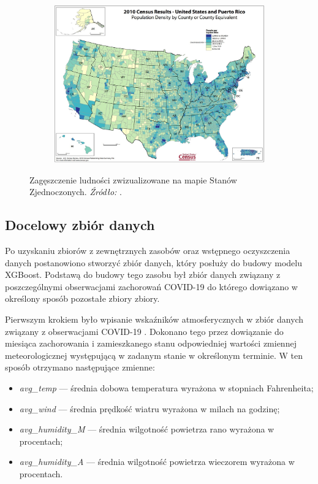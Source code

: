 \documentclass[polish, twoside, 12pt, a4paper]{article}
\theoremstyle{definition}
\theoremstyle{plain}
\theoremstyle{remark}
\begin{document}
\begin{figure}[H]
  \centering
  \begin{subfigure}[t]{\textwidth}
    \includegraphics[width=15cm]{us-desity.jpg}
  \end{subfigure}
  \captionsetup{margin=10pt,font=small,labelfont=bf,width=.8\textwidth}
  \caption{Zagęszczenie ludności zwizualizowane na mapie Stanów Zjednoczonych. \textit{Źródło:} \cite{USCB2021}.}\label{fig:figure:xx5}
\end{figure}

\subsection{Docelowy zbiór danych}

Po uzyskaniu zbiorów z zewnętrznych zasobów oraz wstępnego oczyszczenia danych postanowiono stworzyć zbiór danych, który posłuży do budowy modelu XGBoost. Podstawą do budowy tego zasobu był zbiór danych związany z poszczególnymi obserwacjami zachorowań COVID-19 do którego dowiązano w określony sposób pozostałe zbiory zbiory.

Pierwszym krokiem było wpisanie wskaźników atmosferycznych w zbiór danych związany z obserwacjami COVID-19 . Dokonano tego przez dowiązanie do miesiąca zachorowania i zamieszkanego stanu odpowiedniej wartości zmiennej meteorologicznej występującą w zadanym stanie w określonym terminie. W ten sposób otrzymano następujące zmienne:
\begin{itemize}[noitemsep]
  \item \emph{avg\_temp} --- średnia dobowa temperatura wyrażona w stopniach Fahrenheita;
  \item \emph{avg\_wind} --- średnia prędkość wiatru wyrażona w milach na godzinę;
  \item \emph{avg\_humidity\_M} --- średnia wilgotność powietrza rano wyrażona w procentach;
  \item \emph{avg\_humidity\_A} --- średnia wilgotność powietrza wieczorem wyrażona w procentach.
\end{itemize}
\end{document}
